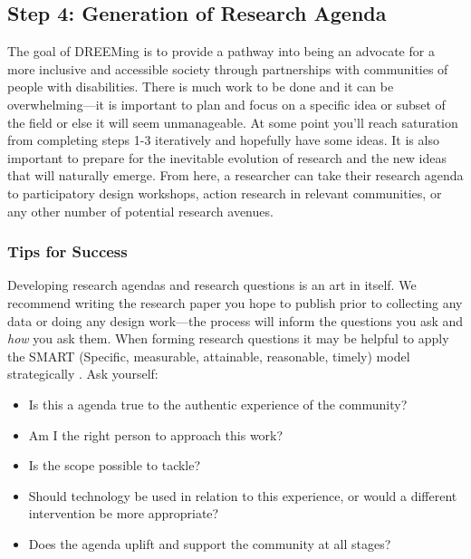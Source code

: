 \subsection{Step 4: Generation of Research Agenda}
The goal of DREEMing is to provide a pathway into being an advocate for a more inclusive and accessible society through partnerships with communities of people with disabilities. There is much work to be done and it can be overwhelming—it is important to plan and focus on a specific idea or subset of the field or else it will seem unmanageable. At some point you'll reach saturation from completing steps 1-3 iteratively and hopefully have some ideas. It is also important to prepare for the inevitable evolution of research and the new ideas that will naturally emerge. From here, a researcher can take their research agenda to participatory design workshops, action research in relevant communities, or any other number of potential research avenues.

\subsubsection{Tips for Success}
Developing research agendas and research questions is an art in itself. We recommend writing the research paper you hope to publish prior to collecting any data or doing any design work—the process will inform the questions you ask and \textit{how} you ask them. When forming research questions it may be helpful to apply the SMART (Specific, measurable, attainable, reasonable, timely) model strategically \cite{fieldingTargetSettingPolicy1999}. Ask yourself:
\begin{itemize}
\item Is this a agenda true to the authentic experience of the community?
\item Am I the right person to approach this work? 
\item Is the scope possible to tackle?
\item Should technology be used in relation to this experience, or would a different intervention be more appropriate?
\item Does the agenda uplift and support the community at all stages?
\end{itemize}

